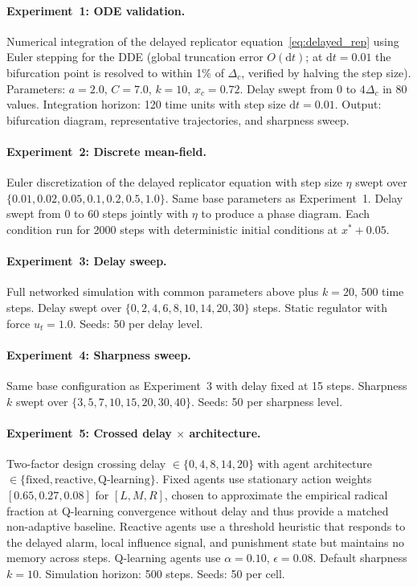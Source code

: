 \paragraph{Experiment~1: ODE validation.} Numerical integration of the delayed replicator equation~\eqref{eq:delayed_rep} using Euler stepping for the DDE (global truncation error $O(\mathrm{d}t)$; at $\mathrm{d}t=0.01$ the bifurcation point is resolved to within 1\% of $\Delta_c$, verified by halving the step size). Parameters: $a=2.0$, $C=7.0$, $k=10$, $x_c=0.72$. Delay swept from $0$ to $4\Delta_c$ in 80 values. Integration horizon: 120 time units with step size $\mathrm{d}t=0.01$. Output: bifurcation diagram, representative trajectories, and sharpness sweep.

\paragraph{Experiment~2: Discrete mean-field.} Euler discretization of the delayed replicator equation with step size $\eta$ swept over $\{0.01, 0.02, 0.05, 0.1, 0.2, 0.5, 1.0\}$. Same base parameters as Experiment~1. Delay swept from 0 to 60 steps jointly with $\eta$ to produce a phase diagram. Each condition run for 2000 steps with deterministic initial conditions at $x^*+0.05$.

\paragraph{Experiment~3: Delay sweep.} Full networked simulation with common parameters above plus $k=20$, 500 time steps. Delay swept over $\{0, 2, 4, 6, 8, 10, 14, 20, 30\}$ steps. Static regulator with force $u_t=1.0$. Seeds: 50 per delay level.

\paragraph{Experiment~4: Sharpness sweep.} Same base configuration as Experiment~3 with delay fixed at 15 steps. Sharpness $k$ swept over $\{3, 5, 7, 10, 15, 20, 30, 40\}$. Seeds: 50 per sharpness level.

\paragraph{Experiment~5: Crossed delay $\times$ architecture.} Two-factor design crossing delay $\in\{0, 4, 8, 14, 20\}$ with agent architecture $\in\{\text{fixed}, \text{reactive}, \text{Q-learning}\}$. Fixed agents use stationary action weights $[0.65, 0.27, 0.08]$ for $[L, M, R]$, chosen to approximate the empirical radical fraction at Q-learning convergence without delay and thus provide a matched non-adaptive baseline. Reactive agents use a threshold heuristic that responds to the delayed alarm, local influence signal, and punishment state but maintains no memory across steps. Q-learning agents use $\alpha=0.10$, $\epsilon=0.08$. Default sharpness $k=10$. Simulation horizon: 500 steps. Seeds: 50 per cell.

